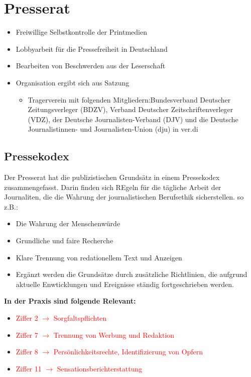 \chapter{Presserat}
\begin{itemize}
    \item Freiwillige Selbstkontrolle der Printmedien
    \item Lobbyarbeit für die Pressefreiheit in Deutschland
    \item Bearbeiten von Beschwerden aus der Leserschaft
    \item Organisation ergibt sich aus Satzung
    \begin{itemize}
        \item Tragerverein mit folgenden Mitgliedern:Bundesverband Deutscher Zeitungsverleger (BDZV), Verband Deutscher Zeitschriftenverleger (VDZ), der Deutsche Journalisten-Verband (DJV) und die Deutsche Journalistinnen- und Journalisten-Union (dju) in ver.di 
    \end{itemize}
\end{itemize}
%
%
%
\section{Pressekodex}
Der Presserat hat die publizistischen Grundsätz in einem Pressekodex zusammengefasst. Darin finden sich REgeln für die tägliche Arbeit der Journaliten, die die Wahrung der journalistischen Berufsethik sicherstellen. so z.B.: 
\begin{itemize}
    \item Die Wahrung der Menschenwürde
    \item Grundliche und faire Recherche
    \item Klare Trennung von redationellem Text und Anzeigen
    \item Ergänzt werden die Grundsätze durch zusätzliche Richtlinien, die aufgrund aktuelle Enwticklungen und Ereignisse ständig fortgeschrieben werden. 
\end{itemize}
\textbf{In der Praxis sind folgende Relevant:}
\begin{itemize}
    \item \textcolor{red}{Ziffer 2 $\rightarrow$ Sorgfaltspflichten}
    \item \textcolor{red}{Ziffer 7 $\rightarrow$ Trennung von Werbung und Redaktion}
    \item \textcolor{red}{Ziffer 8 $\rightarrow$ Persönlichkeitsrechte, Identifizierung von Opfern}
    \item \textcolor{red}{Ziffer 11 $\rightarrow$ Sensationsberichterstattung}
\end{itemize}
%
%
%
